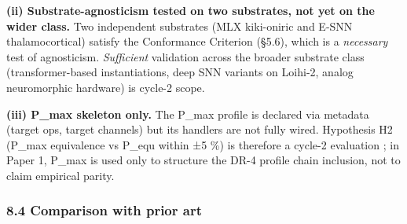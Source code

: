 \documentclass[
]{article}
\begin{document}
\textbf{(ii) Substrate-agnosticism tested on two substrates, not yet on
the wider class.} Two independent substrates (MLX kiki-oniric and E-SNN
thalamocortical) satisfy the Conformance Criterion (§5.6), which is a
\emph{necessary} test of agnosticism. \emph{Sufficient} validation
across the broader substrate class (transformer-based instantiations,
deep SNN variants on Loihi-2, analog neuromorphic hardware) is cycle-2
scope.

\textbf{(iii) P\_max skeleton only.} The P\_max profile is declared via
metadata (target ops, target channels) but its handlers are not fully
wired. Hypothesis H2 (P\_max equivalence vs P\_equ within ±5 \%) is
therefore a cycle-2 evaluation ; in Paper 1, P\_max is used only to
structure the DR-4 profile chain inclusion, not to claim empirical
parity.

\subsubsection{8.4 Comparison with prior
art}\label{comparison-with-prior-art}
\end{document}
